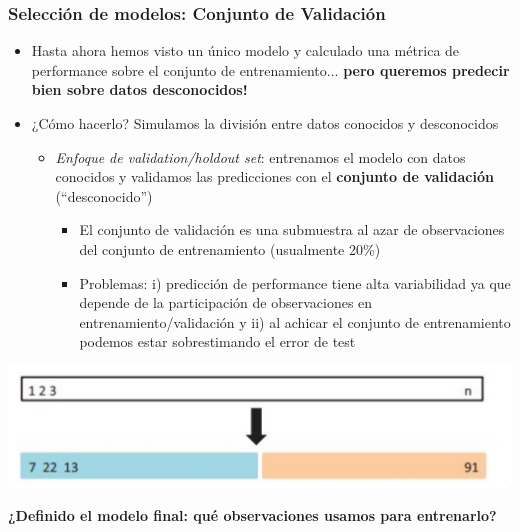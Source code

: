 \documentclass[leqno, 10pt, envcountsect]{beamer}
\numberwithin{equation}{section}
\theoremstyle{definition}
\theoremstyle{example}
\numberwithin{figure}{section}
\numberwithin{table}{section}
\let\olditem\item
\renewcommand{\item}{%
\olditem\vspace{1pt}}
\begin{document}
\begin{frame}
  \frametitle{Selección de modelos: Conjunto de Validación}
  \begin{itemize}
    \item Hasta ahora hemos visto un único modelo y calculado una métrica de
      performance sobre el conjunto de entrenamiento... \textbf{pero queremos
      predecir bien sobre datos desconocidos!}
    \item ¿Cómo hacerlo? Simulamos la división entre datos conocidos y
      desconocidos
          \begin{itemize}
            \item \textit{Enfoque de validation/holdout set}: entrenamos el
              modelo con datos conocidos y validamos las predicciones con el
              \textbf{conjunto de validación} (\enquote{desconocido})
              \begin{itemize}
                \item El conjunto de validación es una submuestra al azar de
                  observaciones del conjunto de entrenamiento (usualmente
                  20\%)
                \item Problemas: i) predicción de performance tiene alta
                  variabilidad ya que depende de la participación de
                  observaciones en entrenamiento/validación y ii) al achicar el
                  conjunto de entrenamiento podemos estar sobrestimando el error
                  de test
              \end{itemize}
           \end{itemize}
  \end{itemize}
  \begin{center}
    \includegraphics[scale=0.16]{holdout.png}
  \end{center}
  \textbf{¿Definido el modelo final: qué observaciones usamos para entrenarlo?}
\end{frame}
\end{document}
